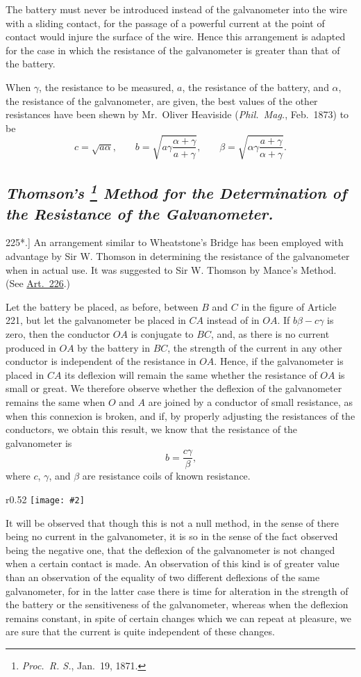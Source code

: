 \documentclass[12pt,oneside]{book}[2021/10/04]
\let\oldfootnote\footnote
\renewcommand\footnote[1]{%
\oldfootnote{\hspace{0.14em}#1}}
\newcommand{\Heading}{\centering\normalfont}
\newcommand{\Subsection}[1]{\subsection*{\normalsize\Heading\itshape #1}}
\newcommand{\article}[1]{\phantomsection \label{art:#1}{#1.]}}
\newcommand{\wrapfig}[3]{
\begin{wrapfigure}{r}{#1\textwidth}
\centering
\texttt{[image: \#2]}
\caption*{\small #3}
\end{wrapfigure}}
\newcommand{\¬}{\hphantom{0}}
\begin{document}
The battery must never be introduced instead of the galvanometer
into the wire with a sliding contact, for the passage of a
powerful current at the point of contact would injure the surface
of the wire. Hence this arrangement is adapted for the case in
which the resistance of the galvanometer is greater than that of the
battery.

When \(\gamma\), the resistance to be measured, \(a\), the resistance of the
battery, and \(\alpha\), the resistance of the galvanometer, are given, the
best values of the other resistances have been shewn by Mr.\ Oliver
Heaviside (\textit{Phil.\ Mag.}, Feb.\ 1873) to be
\[
c=\sqrt{a\alpha}\text{,} \qquad b=\sqrt{a\gamma\frac{\alpha + \gamma}{a + \gamma}}\text{,} \qquad \beta = \sqrt{\alpha \gamma \frac{a + \gamma }{\alpha + \gamma}}\text{.}
\]

\Subsection{Thomson's\footnote{
\textit{Proc.\ R. S.}, Jan.\ 19, 1871.} Method for the Determination of the Resistance of
the Galvanometer.}

\article{225*} An arrangement similar to Wheatstone's Bridge has been
employed with advantage by
Sir W. Thomson in determining
the resistance of the galvanometer
when in actual use.
It was suggested to Sir W.
Thomson by Mance's Method.
(See \hyperref[art:226*]{Art.\ 226}.)

Let the battery be placed,
as before, between \(B\) and \(C\)
in the figure of Article 221,
but let the galvanometer be
placed in \(CA\) instead of in
\(OA\). If \(b \beta - c \gamma\) is zero, then
the conductor \(OA\) is conjugate
to \(BC\), and, as there is no current
produced in \(OA\) by the battery in \(BC\), the strength of the
current in any other conductor is independent of the resistance
in \(OA\). Hence, if the galvanometer is placed in \(CA\) its deflexion
will remain the same whether the resistance of \(OA\) is small or
great. We therefore observe whether the deflexion of the galvanometer
remains the same when \(O\) and \(A\) are joined by a conductor
of small resistance, as when this connexion is broken, and if, by
properly adjusting the resistances of the conductors, we obtain this
result, we know that the resistance of the galvanometer is
\[
b = \frac{c\gamma}{\beta}\text{,}
\]
where \(c\), \(\gamma\), and \(\beta\) are resistance coils of known resistance.

\wrapfig{0.52}{210.png}{Fig. 50.}
It will be observed that though this is not a null method, in the
sense of there being no current in the galvanometer, it is so in
the sense of the fact observed being the negative one, that the
deflexion of the galvanometer is not changed when a certain contact
is made. An observation of this kind is of greater value
than an observation of the equality of two different deflexions of
the same galvanometer, for in the latter case there is time for
alteration in the strength of the battery or the sensitiveness of
the galvanometer, whereas when the deflexion remains constant,
in spite of certain changes which we can repeat at pleasure, we are
sure that the current is quite independent of these changes.
\end{document}

